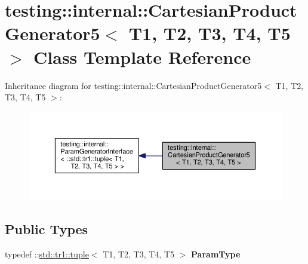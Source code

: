 \hypertarget{classtesting_1_1internal_1_1_cartesian_product_generator5}{}\section{testing\+:\+:internal\+:\+:Cartesian\+Product\+Generator5$<$ T1, T2, T3, T4, T5 $>$ Class Template Reference}
\label{classtesting_1_1internal_1_1_cartesian_product_generator5}


Inheritance diagram for testing\+:\+:internal\+:\+:Cartesian\+Product\+Generator5$<$ T1, T2, T3, T4, T5 $>$\+:
\nopagebreak
\begin{figure}[H]
\begin{center}
\leavevmode
\includegraphics[width=350pt]{classtesting_1_1internal_1_1_cartesian_product_generator5__inherit__graph}
\end{center}
\end{figure}
\subsection*{Public Types}
\begin{DoxyCompactItemize}
\item 
\mbox{\label{classtesting_1_1internal_1_1_cartesian_product_generator5_a081ee8effde35f8caa9ec79cf9c29cbd}} 
typedef \+::\mbox{\hyperlink{classstd_1_1tr1_1_1tuple}{std\+::tr1\+::tuple}}$<$ T1, T2, T3, T4, T5 $>$ {\bfseries Param\+Type}
\end{DoxyCompactItemize}
